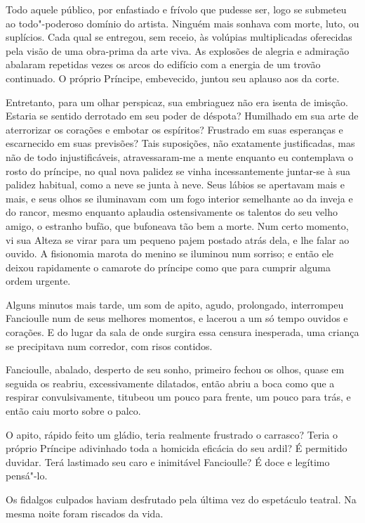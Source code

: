 Todo aquele público, por enfastiado e frívolo que pudesse ser, logo
se submeteu ao todo"-poderoso domínio do artista. Ninguém mais
sonhava com morte, luto, ou suplícios. Cada qual se entregou,
sem receio, às volúpias multiplicadas oferecidas pela visão de uma obra-prima 
da arte viva. As explosões de alegria e admiração abalaram
repetidas vezes os arcos do edifício com a energia de um trovão
continuado. O próprio Príncipe, embevecido, juntou seu aplauso aos da
corte.

Entretanto, para um olhar perspicaz, sua embriaguez não era isenta de
imisção. Estaria se sentido derrotado em seu poder de déspota? Humilhado em
sua arte de aterrorizar os corações e embotar os espíritos? Frustrado
em suas esperanças e escarnecido em suas previsões? Tais suposições,
não exatamente justificadas, mas não de todo injustificáveis,
atravessaram-me a mente enquanto eu contemplava o rosto do príncipe,
no qual nova palidez se vinha incessantemente juntar-se à sua palidez habitual, como
a neve se junta à neve. Seus lábios se apertavam mais e mais, e seus
olhos se iluminavam com um fogo interior semelhante ao da inveja e do
rancor, mesmo enquanto aplaudia ostensivamente os talentos do seu velho
amigo, o estranho bufão, que bufoneava tão bem a morte. Num certo
momento, vi sua Alteza se virar para um pequeno pajem postado atrás
dela, e lhe falar ao ouvido. A fisionomia marota do menino se iluminou
num sorriso; e então ele deixou rapidamente o camarote do príncipe como
que para cumprir alguma ordem urgente.

Alguns minutos mais tarde, um som de apito, agudo, prolongado, interrompeu
Fancioulle num de seus melhores momentos, e lacerou a um só tempo
ouvidos e corações. E do lugar da sala de onde surgira essa
censura inesperada, uma criança se precipitava num corredor, com
risos contidos.

Fancioulle, abalado, desperto de seu sonho, primeiro fechou os olhos,
quase em seguida os reabriu, excessivamente dilatados, então abriu a
boca como que a respirar convulsivamente, titubeou um pouco para
frente, um pouco para trás, e então caiu morto sobre o palco.

O apito, rápido feito um gládio, teria realmente frustrado o carrasco?
Teria o próprio Príncipe adivinhado toda a homicida eficácia do seu
ardil? É permitido duvidar. Terá lastimado seu caro e inimitável
Fancioulle? É doce e legítimo pensá"-lo.

Os fidalgos culpados haviam desfrutado pela última vez do espetáculo
teatral. Na mesma noite foram riscados da vida.


